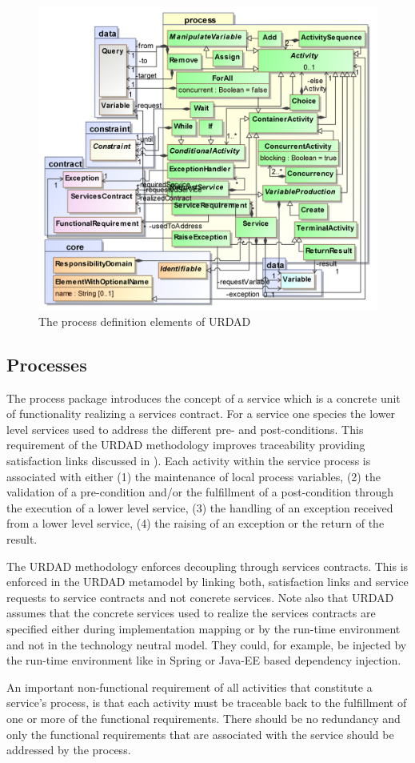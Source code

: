 \begin{figure}[Htbp]
  \centering
  \includegraphics{process}
  \caption{The process definition elements of URDAD}
  \label{fig:metamodel}
\end{figure}

\subsection{Processes}

The process package introduces the concept of a service which is a concrete unit of functionality realizing a services contract. For a service one species the lower level services used to address the different pre- and post-conditions. This requirement of the URDAD methodology improves traceability providing satisfaction links discussed in \cite{ramesh_toward_2001}). Each activity within the service process is associated with either (1) the maintenance of local process variables, (2) the validation of a pre-condition and/or the fulfillment of a post-condition through the execution of a lower level service, (3) the handling of an exception received from a lower level service, (4) the raising of an exception or the return of the result.

The URDAD methodology enforces decoupling through services contracts. This is  enforced in the URDAD metamodel by linking both, satisfaction links and service requests to service contracts and not concrete services. Note also that URDAD assumes that the concrete services used to realize the services contracts are specified either during implementation mapping or by the run-time environment and not in the technology neutral model. They could, for example, be injected by the run-time environment like in Spring or Java-EE based dependency injection.

An important non-functional requirement of all activities that constitute a service's process, is that each activity must be traceable back to the fulfillment of one or more of the functional requirements. There should be no redundancy and only the functional requirements that are associated with the service should be addressed by the process.


